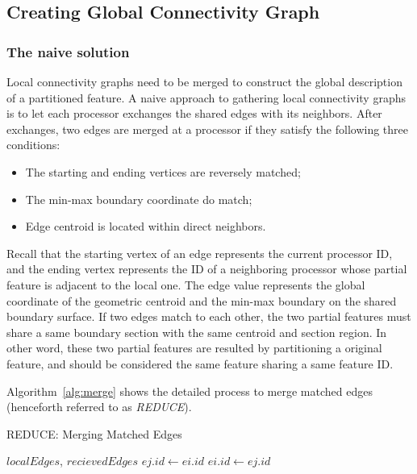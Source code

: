 \documentclass[10pt, conference, compsocconf]{IEEEtran}
\begin{document}
\subsection{Creating Global Connectivity Graph}
\subsubsection{The naive solution}

Local connectivity graphs need to be merged to construct the global description of a partitioned feature. A naive approach to gathering local connectivity graphs is to let each processor exchanges the shared edges with its neighbors. After exchanges, two edges are merged at a processor if they satisfy the following three conditions:

\begin{itemize}
\item The starting and ending vertices are reversely matched;
\item The min-max boundary coordinate do match;
\item Edge centroid is located within direct neighbors.
\end{itemize}

Recall that the starting vertex of an edge represents the current processor ID, and the ending vertex represents the ID of a neighboring processor whose partial feature is adjacent to the local one. The edge value represents the global coordinate of the geometric centroid and the min-max boundary on the shared boundary surface. If two edges match to each other, the two partial features must share a same boundary section with the same centroid and section region. In other word, these two partial features are resulted by partitioning a original feature, and should be considered the same feature sharing a same feature ID.

Algorithm~\ref{alg:merge} shows the detailed process to merge matched edges (henceforth referred to as \emph{REDUCE}).
\begin{algorithm}
\caption{REDUCE: Merging Matched Edges}
\label{alg:merge}
\begin{algorithmic}[1]
\REQUIRE $localEdges$, $recievedEdges$
				\STATE $ej.id \leftarrow ei.id$
			\ELSE
				\STATE $ei.id \leftarrow ej.id$
			\ENDIF
		\ENDIF
	\ENDFOR	
\ENDFOR	
\end{algorithmic}
\end{algorithm}
\end{document}
